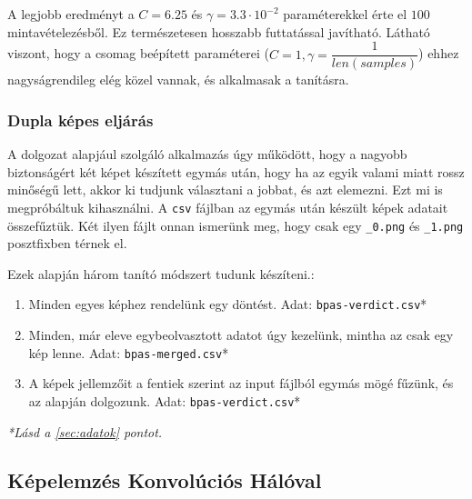 A legjobb eredményt a $ C=6.25 $ és $ \gamma = 3.3 \cdot 10^{-2} $ paraméterekkel érte el $ 100 $
mintavételezésből. Ez természetesen hosszabb futtatással javítható. Látható viszont, hogy a csomag
beépített paraméterei ($ C=1 , \gamma =\dfrac{1}{len(samples)} $) ehhez nagyságrendileg elég közel vannak,
és alkalmasak a tanításra.


\subsubsection{Dupla képes eljárás}
\label{sec:dupla.kepes.eljaras}

A dolgozat alapjául szolgáló alkalmazás úgy működött, hogy a nagyobb biztonságért két képet készített
egymás után, hogy ha az egyik valami miatt rossz minőségű lett, akkor ki tudjunk választani a jobbat, 
és azt elemezni. Ezt mi is megpróbáltuk kihasználni. A \texttt{csv} fájlban az egymás után készült képek adatait
összefűztük. Két ilyen fájlt onnan ismerünk meg, hogy csak egy \texttt{\_0.png} és \texttt{\_1.png}
posztfixben térnek el.

Ezek alapján három tanító módszert tudunk készíteni.:
\begin{enumerate}
	\item
	Minden egyes képhez rendelünk egy döntést.
	Adat: \texttt{bpas-verdict.csv}*
	\item 
	Minden, már eleve egybeolvasztott adatot úgy kezelünk, mintha az csak 
	egy kép lenne. Adat: \texttt{bpas-merged.csv}*
	
	\item 
	A képek jellemzőit a fentiek szerint az input fájlból egymás mögé 
	fűzünk, és az alapján dolgozunk.
	Adat: \texttt{bpas-verdict.csv}*
\end{enumerate}

\textit{*Lásd a \ref{sec:adatok} pontot.}
%
%
%
%
%
%


\newpage
\subsection{Képelemzés Konvolúciós Hálóval}
\label{sec:cnn}


